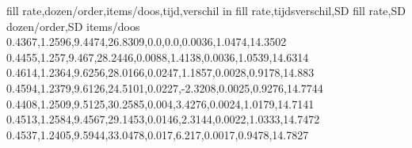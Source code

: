 fill rate,dozen/order,items/doos,tijd,verschil in fill rate,tijdsverschil,SD fill rate,SD dozen/order,SD items/doos
0.4367,1.2596,9.4474,26.8309,0.0,0.0,0.0036,1.0474,14.3502
0.4455,1.257,9.467,28.2446,0.0088,1.4138,0.0036,1.0539,14.6314
0.4614,1.2364,9.6256,28.0166,0.0247,1.1857,0.0028,0.9178,14.883
0.4594,1.2379,9.6126,24.5101,0.0227,-2.3208,0.0025,0.9276,14.7744
0.4408,1.2509,9.5125,30.2585,0.004,3.4276,0.0024,1.0179,14.7141
0.4513,1.2584,9.4567,29.1453,0.0146,2.3144,0.0022,1.0333,14.7472
0.4537,1.2405,9.5944,33.0478,0.017,6.217,0.0017,0.9478,14.7827
